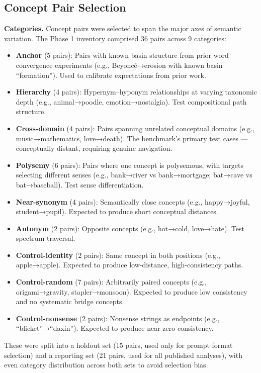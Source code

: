 \subsection{Concept Pair Selection}\label{concept-pair-selection}

\textbf{Categories.} Concept pairs were selected to span the major axes of semantic variation. The Phase 1 inventory comprised 36 pairs across 9 categories:

\begin{itemize}
\tightlist
\item
  \textbf{Anchor} (5 pairs): Pairs with known basin structure from prior word convergence experiments (e.g., Beyoncé→erosion with known basin ``formation''). Used to calibrate expectations from prior work.
\item
  \textbf{Hierarchy} (4 pairs): Hypernym--hyponym relationships at varying taxonomic depth (e.g., animal→poodle, emotion→nostalgia). Test compositional path structure.
\item
  \textbf{Cross-domain} (4 pairs): Pairs spanning unrelated conceptual domains (e.g., music→mathematics, love→death). The benchmark's primary test cases --- conceptually distant, requiring genuine navigation.
\item
  \textbf{Polysemy} (6 pairs): Pairs where one concept is polysemous, with targets selecting different senses (e.g., bank→river vs bank→mortgage; bat→cave vs bat→baseball). Test sense differentiation.
\item
  \textbf{Near-synonym} (4 pairs): Semantically close concepts (e.g., happy→joyful, student→pupil). Expected to produce short conceptual distances.
\item
  \textbf{Antonym} (2 pairs): Opposite concepts (e.g., hot→cold, love→hate). Test spectrum traversal.
\item
  \textbf{Control-identity} (2 pairs): Same concept in both positions (e.g., apple→apple). Expected to produce low-distance, high-consistency paths.
\item
  \textbf{Control-random} (7 pairs): Arbitrarily paired concepts (e.g., origami→gravity, stapler→monsoon). Expected to produce low consistency and no systematic bridge concepts.
\item
  \textbf{Control-nonsense} (2 pairs): Nonsense strings as endpoints (e.g., ``blicket''→``daxin''). Expected to produce near-zero consistency.
\end{itemize}

These were split into a holdout set (15 pairs, used only for prompt format selection) and a reporting set (21 pairs, used for all published analyses), with even category distribution across both sets to avoid selection bias.

